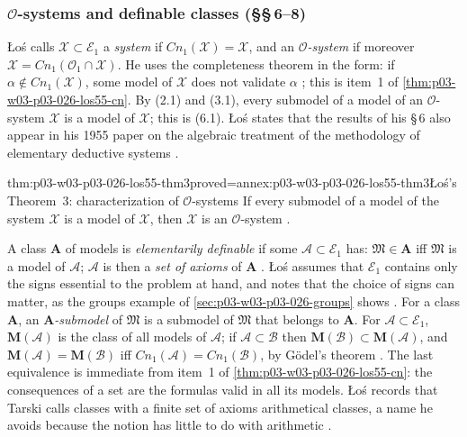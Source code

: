 \subsubsection{\(\mathcal O\)-systems and definable classes (\S\S\,6--8)}

\L o\'s calls \(\mathcal X\subset\mathcal E_1\) a \emph{system} if
\(\mathit{Cn}_1(\mathcal X)=\mathcal X\), and an \emph{\(\mathcal O\)-system}
if moreover \(\mathcal X=\mathit{Cn}_1(\mathcal O_1\cap\mathcal X)\).  He uses
the completeness theorem in the form: if \(\alpha\notin\mathit{Cn}_1(\mathcal X)\),
some model of \(\mathcal X\) does not validate \(\alpha\)
\cite[p.~46]{Los1955}; this is item~1 of
\cref{thm:p03-w03-p03-026-los55-cn}.  By (2.1) and (3.1), every submodel of a
model of an \(\mathcal O\)-system \(\mathcal X\) is a model of \(\mathcal X\);
this is (6.1).  \L o\'s states that the results of his \S\,6 also appear in
his 1955 paper on the algebraic treatment of the methodology of elementary
deductive systems \cite[p.~46]{Los1955}.

\begin{hbtheorem}{thm:p03-w03-p03-026-los55-thm3}{proved=annex:p03-w03-p03-026-los55-thm3}{\L o\'s's Theorem~3: characterization of \(\mathcal O\)-systems}
If every submodel of a model of the system \(\mathcal X\) is a model of
\(\mathcal X\), then \(\mathcal X\) is an \(\mathcal O\)-system
\cite[p.~46]{Los1955}.
\end{hbtheorem}

A class \(\mathbf A\) of models is \emph{elementarily definable} if some
\(\mathcal A\subset\mathcal E_1\) has: \(\mathfrak M\in\mathbf A\) iff
\(\mathfrak M\) is a model of \(\mathcal A\); \(\mathcal A\) is then a
\emph{set of axioms} of \(\mathbf A\) \cite[p.~46]{Los1955}.  \L o\'s
assumes that \(\mathcal E_1\) contains only the signs essential to the
problem at hand, and notes that the choice of signs can matter, as the
groups example of \cref{sec:p03-w03-p03-026-groups} shows
\cite[p.~47]{Los1955}.  For a class \(\mathbf A\), an
\emph{\(\mathbf A\)-submodel} of \(\mathfrak M\) is a submodel of
\(\mathfrak M\) that belongs to \(\mathbf A\).  For
\(\mathcal A\subset\mathcal E_1\), \(\mathbf M(\mathcal A)\) is the class of
all models of \(\mathcal A\); if \(\mathcal A\subset\mathcal B\) then
\(\mathbf M(\mathcal B)\subset\mathbf M(\mathcal A)\), and
\(\mathbf M(\mathcal A)=\mathbf M(\mathcal B)\) iff
\(\mathit{Cn}_1(\mathcal A)=\mathit{Cn}_1(\mathcal B)\), by G\"odel's theorem
\cite[p.~47]{Los1955}.  The last equivalence is immediate from item~1 of
\cref{thm:p03-w03-p03-026-los55-cn}: the consequences of a set are the
formulas valid in all its models.  \L o\'s records that Tarski calls classes
with a finite set of axioms arithmetical classes, a name he avoids because the
notion has little to do with arithmetic \cite[p.~47]{Los1955}.


